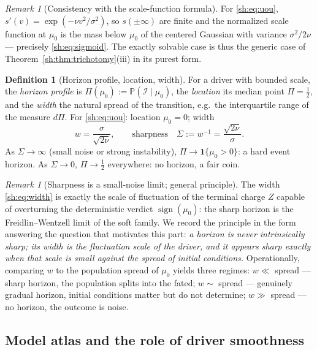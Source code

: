 \documentclass[11pt]{article}
\numberwithin{equation}{section}
\theoremstyle{plain}
\theoremstyle{definition}
\newtheorem{definition}[theorem]{Definition}
\theoremstyle{remark}
\newtheorem{remark}[theorem]{Remark}
\newcommand{\PP}{\mathbb{P}}
\newcommand{\one}{\mathbf{1}}
\newcommand{\Imm}{\mathcal{I}}
\begin{document}
\begin{remark}[Consistency with the scale-function formula]
\label{sh:rem:crosscheck}
For \eqref{sh:eq:uou}, $s'(v)=\exp(-\nu v^2/\sigma^2)$, so
$s(\pm\infty)$ are finite and the normalized scale function at $\mu_0$ is
the mass below $\mu_0$ of the centered Gaussian with variance
$\sigma^2/2\nu$ --- precisely \eqref{sh:eq:sigmoid}. The exactly solvable
case is thus the generic case of
Theorem~\ref{sh:thm:trichotomy}(iii) in its purest form.
\end{remark}

\begin{definition}[Horizon profile, location, width]\label{sh:def:width}
For a driver with bounded scale, the \emph{horizon profile} is
$\Pi(\mu_0):=\PP(\Imm\mid\mu_0)$, the \emph{location} its median point
$\Pi=\tfrac12$, and the \emph{width} the natural spread of the transition,
e.g.\ the interquartile range of the measure $d\Pi$. For
\eqref{sh:eq:uou}: location $\mu_0=0$; width
\begin{equation}\label{sh:eq:width}
w=\frac{\sigma}{\sqrt{2\nu}},\qquad\text{sharpness}\quad
\Sigma:=w^{-1}=\frac{\sqrt{2\nu}}{\sigma}.
\end{equation}
As $\Sigma\to\infty$ (small noise or strong instability),
$\Pi\to\one\{\mu_0>0\}$: a hard event horizon. As $\Sigma\to0$,
$\Pi\to\tfrac12$ everywhere: no horizon, a fair coin.
\end{definition}

\begin{remark}[Sharpness is a small-noise limit; general principle]
\label{sh:rem:FW}
The width \eqref{sh:eq:width} is exactly the scale of fluctuation of the
terminal charge $Z$ capable of overturning the deterministic verdict
$\operatorname{sign}(\mu_0)$: the sharp horizon is the Freidlin--Wentzell
limit \cite{FW12} of the soft family. We record the principle in the form
answering the question that motivates this part: \emph{a horizon is
never intrinsically sharp; its width is the fluctuation scale of the
driver, and it appears sharp exactly when that scale is small against the
spread of initial conditions.} Operationally, comparing $w$ to the
population spread of $\mu_0$ yields three regimes: $w\ll$ spread --- sharp
horizon, the population splits into the fated; $w\sim$ spread --- genuinely
gradual horizon, initial conditions matter but do not determine;
$w\gg$ spread --- no horizon, the outcome is noise.
\end{remark}

\subsection{Model atlas and the role of driver smoothness}
\label{sh:subsub:atlas}
\end{document}
